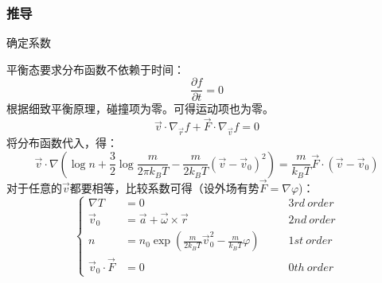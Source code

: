 \documentclass{if-beamer}
\begin{document}
\begin{frame}
    \frametitle{推导}
    \begin{block}{确定系数}
        
            平衡态要求分布函数不依赖于时间：
            \begin{equation*}
                \frac{\partial f}{\partial{t}}=0
            \end{equation*}
            根据细致平衡原理，碰撞项为零。可得运动项也为零。
            \begin{equation*}
                \vec{v}\cdot\nabla_{\vec{r}}{f}+\vec{F}\cdot\nabla_{\vec{v}}{f}=0
            \end{equation*}
            将分布函数代入，得：
            \begin{equation*}
                \vec{v} \cdot \nabla\left(\log n+\frac{3}{2} \log \frac{m}{2 \pi k_{B} T}-\frac{m}{2 k_{B} T}\left(\vec{v}-\vec{v}_{0}\right)^{2}\right)=\frac{m}{k_{B} T} \vec{F} \cdot\left(\vec{v}-\vec{v}_{0}\right)
            \end{equation*}
            对于任意的$\vec{v}$都要相等，比较系数可得（设外场有势$\vec{F}=\nabla{\varphi}$)：
            \begin{equation*}
                \left\{
                \begin{aligned}
                    \nabla T&=0~~~~~~~~&3rd~order\\
                    \vec{v}_{0}&=\vec{a}+\vec{\omega} \times \vec{r}~~~~~~~~&2nd~order\\
                    n&=n_{0} \exp \left(\frac{m}{2 k_{B} T} \vec{v}_{0}^{2}-\frac{m}{k_{B} T} \varphi\right)~~~~~~~~&1st~order\\
                    \vec{v}_{0} \cdot \vec{F}&=0~~~~~~~~&0th~order
                \end{aligned}
                \right.
            \end{equation*}

    \end{block}


\end{frame}
    
\end{document}
